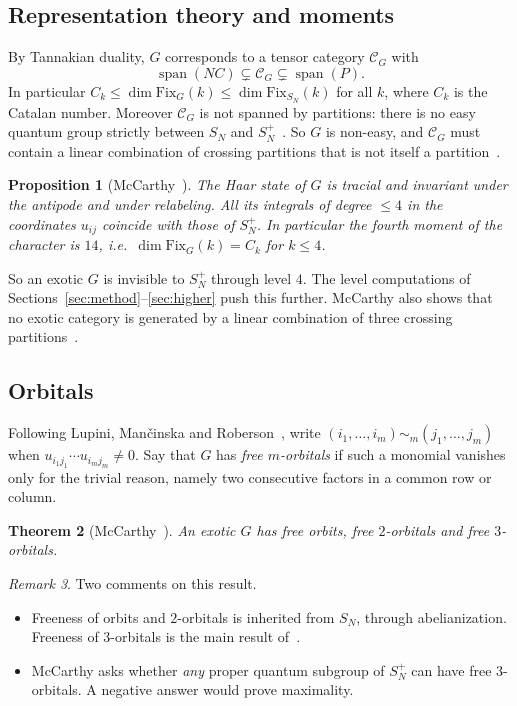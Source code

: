 \documentclass[11pt]{amsart}
\newtheorem{theorem}{Theorem}[section]
\newtheorem{proposition}[theorem]{Proposition}
\theoremstyle{definition}
\theoremstyle{remark}
\newtheorem{remark}[theorem]{Remark}
\theoremstyle{plain}
\numberwithin{equation}{section}
\numberwithin{table}{section}
\newcommand{\Fix}{\mathrm{Fix}}
\DeclareMathOperator{\spn}{span}
\begin{document}
\subsection{Representation theory and moments}

By Tannakian duality, $G$ corresponds to a tensor category $\mathcal C_G$ with
\[
\spn(NC)\subsetneq\mathcal C_G\subsetneq\spn(P).
\]
In particular $C_k\le\dim\Fix_G(k)\le\dim\Fix_{S_N}(k)$ for all $k$, where $C_k$ is the Catalan number. Moreover $\mathcal C_G$ is not spanned by partitions: there is no easy quantum group strictly between $S_N$ and $S_N^+$~\cite{bsp}. So $G$ is non-easy, and $\mathcal C_G$ must contain a linear combination of crossing partitions that is not itself a partition~\cite{mc2}.

\begin{proposition}[McCarthy~\cite{mc1}]\label{prop:mc}
The Haar state of $G$ is tracial and invariant under the antipode and under relabeling. All its integrals of degree $\le4$ in the coordinates $u_{ij}$ coincide with those of $S_N^+$. In particular the fourth moment of the character is $14$, i.e.\ $\dim\Fix_G(k)=C_k$ for $k\le4$.
\end{proposition}

So an exotic $G$ is invisible to $S_N^+$ through level $4$. The level computations of Sections~\ref{sec:method}--\ref{sec:higher} push this further.
McCarthy also shows that no exotic category is generated by a linear combination of three crossing partitions~\cite{mc2}.

\subsection{Orbitals}

Following Lupini, Man{\v c}inska and Roberson~\cite{lmr}, write $(i_1,\dots,i_m)\sim_m(j_1,\dots,j_m)$ when $u_{i_1j_1}\cdots u_{i_mj_m}\ne0$. Say that $G$ has \emph{free $m$-orbitals} if such a monomial vanishes only for the trivial reason, namely two consecutive factors in a common row or column.

\begin{theorem}[McCarthy~\cite{mc1}]\label{thm:orbitals}
An exotic $G$ has free orbits, free $2$-orbitals and free $3$-orbitals.
\end{theorem}

\begin{remark}
Two comments on this result.
\begin{itemize}
\item Freeness of orbits and $2$-orbitals is inherited from $S_N$, through abelianization. Freeness of $3$-orbitals is the main result of~\cite{mc1}.
\item McCarthy asks whether \emph{any} proper quantum subgroup of $S_N^+$ can have free $3$-orbitals. A negative answer would prove maximality.
\end{itemize}
\end{remark}
\end{document}
